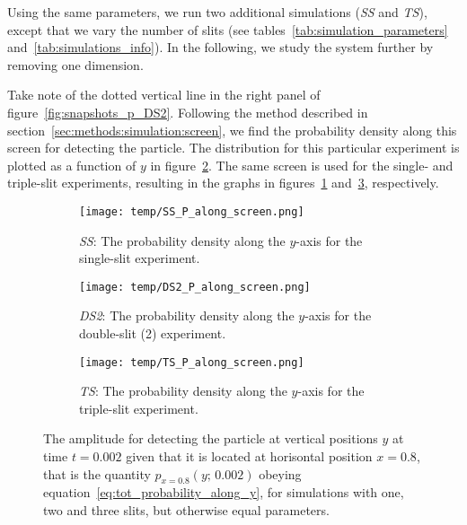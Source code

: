     Using the same parameters, we run two additional simulations (\textit{SS} and \textit{TS}), except that we vary the number of slits (see tables~\ref{tab:simulation_parameters} and~\ref{tab:simulations_info}). In the following, we study the system further by removing one dimension.

    Take note of the dotted vertical line in the right panel of figure~\ref{fig:snapshots_p_DS2}. Following the method described in section~\ref{sec:methods:simulation:screen}, we find the probability density along this screen for detecting the particle.  The distribution for this particular experiment is plotted as a function of $y$ in figure~\ref{fig:p_along_y_DS2}. The same screen is used for the single- and triple-slit experiments, resulting in the graphs in figures~\ref{fig:p_along_y_SS} and~\ref{fig:p_along_y_TS}, respectively. %

    \begin{figure}
        \centering
        \begin{subfigure}{0.46\textwidth}
            \texttt{[image: temp/SS\_P\_along\_screen.png]}
            \caption{\textit{SS}: The probability density along the $y$-axis for the single-slit experiment.}
            \label{fig:p_along_y_SS}
        \end{subfigure}
        \hfill
        \begin{subfigure}{0.46\textwidth}
            \texttt{[image: temp/DS2\_P\_along\_screen.png]}
            \caption{\textit{DS2}: The probability density along the $y$-axis for the double-slit (2) experiment.}
            \label{fig:p_along_y_DS2}
        \end{subfigure}
        \hfill
        \begin{subfigure}{0.46\textwidth}
            \texttt{[image: temp/TS\_P\_along\_screen.png]}
            \caption{\textit{TS}: The probability density along the $y$-axis for the triple-slit experiment.}
            \label{fig:p_along_y_TS}
        \end{subfigure}
        \caption{The amplitude for detecting the particle at vertical positions $y$ at time $t=0.002$ given that it is located at horisontal position $x=0.8$, that is the quantity $p_{x=0.8}(y;\, 0.002)$ obeying equation~\eqref{eq:tot_probability_along_y}, for simulations with one, two and three slits, but otherwise equal parameters.}
        \label{fig:p_along_y}
    \end{figure}






